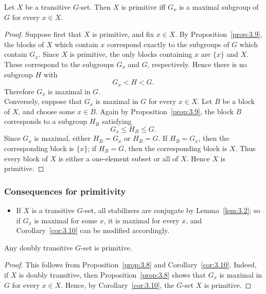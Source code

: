 \documentclass[../Odyssey_Project.tex]{subfiles}
\begin{document}
\begin{corollary}
\label{cor:3.10}
Let $X$ be a transitive $G$-set. Then $X$ is primitive iff $G_x$ is a maximal subgroup of $G$ for every $x \in X$.
\end{corollary}

\begin{proof}
    Suppose first that $X$ is primitive, and fix $x \in X$. By Proposition~\ref{prop:3.9}, the blocks of $X$ which contain $x$ correspond exactly to the subgroups of $G$ which contain $G_x$. Since $X$ is primitive, the only blocks containing $x$ are $\{x\}$ and $X$. These correspond to the subgroups $G_x$ and $G$, respectively. Hence there is no subgroup $H$ with
    \[
        G_x < H < G.
    \]
    Therefore $G_x$ is maximal in $G$. \\
    Conversely, suppose that $G_x$ is maximal in $G$ for every $x \in X$. Let $B$ be a block of $X$, and choose some $x \in B$. Again by Proposition~\ref{prop:3.9}, the block $B$ corresponds to a subgroup $H_B$ satisfying
    \[
        G_x \leq H_B \leq G.
    \]
    Since $G_x$ is maximal, either $H_B = G_x$ or $H_B = G$. If $H_B = G_x$, then the corresponding block is $\{x\}$; if $H_B = G$, then the corresponding block is $X$. Thus every block of $X$ is either a one-element subset or all of $X$. Hence $X$ is primitive.
\end{proof}

\subsubsection*{Consequences for primitivity}
\begin{itemize}
    \item If $X$ is a transitive $G$-set, all stabilizers are conjugate by Lemma~\ref{lem:3.2}; so if $G_x$ is maximal for some $x$, it is maximal for every $x$, and Corollary~\ref{cor:3.10} can be modified accordingly.
\end{itemize}

\begin{corollary}
\label{cor:3.11}
Any doubly transitive $G$-set is primitive.
\end{corollary}

\begin{proof}
    This follows from Proposition~\ref{prop:3.8} and Corollary~\ref{cor:3.10}. Indeed, if $X$ is doubly transitive, then Proposition~\ref{prop:3.8} shows that $G_x$ is maximal in $G$ for every $x \in X$. Hence, by Corollary~\ref{cor:3.10}, the $G$-set $X$ is primitive.
\end{proof}
\end{document}
